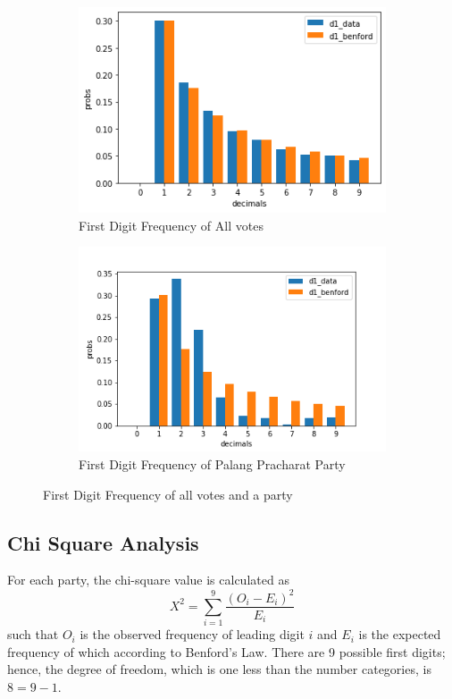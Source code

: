 \documentclass[12pt]{article}
\begin{document}
\begin{figure}[h]
\centering
\begin{subfigure}{.5\textwidth}
  \centering
  \includegraphics[scale=0.4]{complete thai analysis.png}
  \caption{First Digit Frequency of All votes}
  \label{fig:sub1}
\end{subfigure}%
\begin{subfigure}{.5\textwidth}
  \centering
  \includegraphics[scale=0.4]{พลงประชารัฐ.png}
  \caption{First Digit Frequency of Palang Pracharat Party}
  \label{fig:sub2}
\end{subfigure}
\caption{First Digit Frequency of all votes and a party}
\label{fig:test}
\end{figure}


\subsection{Chi Square Analysis}
For each party, the chi-square value is calculated as
$$X^2 = \sum_{i=1}^{9}\frac{(O_i - E_i)^2}{E_i}$$ such that $O_i$ is the observed frequency of leading digit $i$ and $E_i$ is the expected frequency of which according to Benford's Law. There are 9 possible first digits; hence, the degree of freedom, which is one less than the number categories, is $8 = 9-1$.
\end{document}
